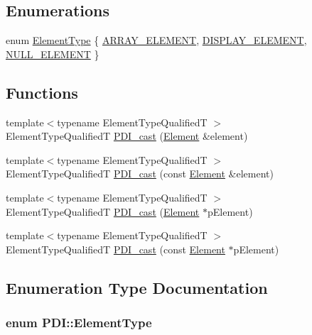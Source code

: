 \subsection*{Enumerations}
\begin{CompactItemize}
\item 
enum \hyperlink{namespace_p_d_i_bbd28c6f8905ff6834d6f84ba4363e5e}{ElementType} \{ \hyperlink{namespace_p_d_i_bbd28c6f8905ff6834d6f84ba4363e5e57323103f5b47fbac48214db5cdc0622}{ARRAY\_\-ELEMENT}, 
\hyperlink{namespace_p_d_i_bbd28c6f8905ff6834d6f84ba4363e5ee043b54cf14e7e99bce4c52d879b56d6}{DISPLAY\_\-ELEMENT}, 
\hyperlink{namespace_p_d_i_bbd28c6f8905ff6834d6f84ba4363e5eb6c09510d6ad7929f8849b4871955c47}{NULL\_\-ELEMENT}
 \}
\end{CompactItemize}
\subsection*{Functions}
\begin{CompactItemize}
\item 
{\footnotesize template$<$typename ElementTypeQualifiedT $>$ }\\ElementTypeQualifiedT \hyperlink{namespace_p_d_i_91e7acfd6c982ef09cc58d6acbfe5cbe}{PDI\_\-cast} (\hyperlink{class_p_d_i_1_1_element}{Element} \&element)
\item 
{\footnotesize template$<$typename ElementTypeQualifiedT $>$ }\\ElementTypeQualifiedT \hyperlink{namespace_p_d_i_b579ac392aa69d9abfae65846e42f4e0}{PDI\_\-cast} (const \hyperlink{class_p_d_i_1_1_element}{Element} \&element)
\item 
{\footnotesize template$<$typename ElementTypeQualifiedT $>$ }\\ElementTypeQualifiedT \hyperlink{namespace_p_d_i_9995a6cf01ffe58f1d6159947a41d0aa}{PDI\_\-cast} (\hyperlink{class_p_d_i_1_1_element}{Element} $\ast$pElement)
\item 
{\footnotesize template$<$typename ElementTypeQualifiedT $>$ }\\ElementTypeQualifiedT \hyperlink{namespace_p_d_i_9940546f948318c316306e3145ed765b}{PDI\_\-cast} (const \hyperlink{class_p_d_i_1_1_element}{Element} $\ast$pElement)
\end{CompactItemize}


\subsection{Enumeration Type Documentation}
\hypertarget{namespace_p_d_i_bbd28c6f8905ff6834d6f84ba4363e5e}{
\subsubsection[{ElementType}]{\setlength{\rightskip}{0pt plus 5cm}enum {\bf PDI::ElementType}}}
\label{namespace_p_d_i_bbd28c6f8905ff6834d6f84ba4363e5e}


